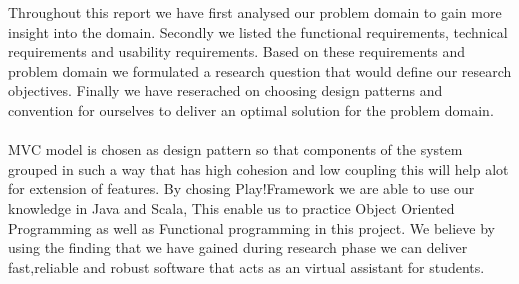 Throughout this report we have first analysed our problem domain to gain more insight into the domain. Secondly we listed the functional requirements, technical requirements and usability requirements. Based on these requirements and problem domain we formulated a research question that would define our research objectives. Finally we have reserached on choosing design patterns and convention for ourselves to deliver an optimal solution for the problem domain.\\\\
MVC model is chosen as design pattern so that components of the system grouped in such a way that has high cohesion and low coupling this will help alot for extension of features. By chosing Play!Framework we are able to use our knowledge in Java and Scala, This enable us to practice Object Oriented Programming as well as Functional programming in this project. We believe by using the finding that we have gained during research phase we can deliver fast,reliable and robust software that acts as an virtual assistant for students.

